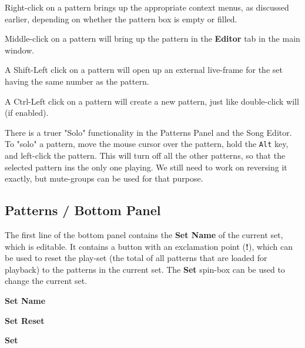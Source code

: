    Right-click on a pattern brings up the appropriate context menus, as
   discussed earlier, depending on whether the pattern box is empty or
   filled.

   Middle-click on a pattern will bring up the pattern in the \textbf{Editor}
   tab in the main window.

   A Shift-Left click on a pattern will open up an external live-frame for the
   set having the same number as the pattern.

   A Ctrl-Left click on a pattern will create a new pattern, just like
   double-click will (if enabled).

   There is a truer "Solo" functionality in the Patterns
   Panel and the Song Editor.  To "solo" a pattern, move the mouse cursor
   over the pattern, hold the \texttt{Alt} key, and left-click the pattern.
   This will turn off all the other patterns, so that the selected pattern ins
   the only one playing.
   We still need to work on reversing it exactly, but
   mute-groups can be used for that purpose.

\subsection{Patterns / Bottom Panel}
\label{subsec:patterns_panel_bottom}

   The first line of the bottom panel contains the \textbf{Set Name}
   of the current set, which is editable.
   It contains a button with an exclamation point (\textbf{!}), which
   can be used to reset the play-set (the total of all patterns that are loaded
   for playback) to the patterns in the current set.
   The \textbf{Set} spin-box can be used to change the current set.

   \begin{enumber}
      \item \textbf{Set Name}
      \item \textbf{Set Reset}
      \item \textbf{Set}
   \end{enumber}

